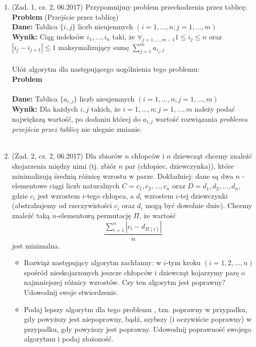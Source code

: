 \documentclass[10pt]{article}%
\begin{document}
\begin{enumerate}

\item (Zad. 1, cz. 2, 06.2017) Przypomnijmy problem przechodzenia przez tablicę: \\
\noindent\textbf{Problem} (Przejście przez tablicę) \\
\indent \textbf{Dane:} Tablica $\{i,j\}$ liczb nieujemnych $(i=1,\ldots,n; j=1,\ldots,m)$ \\
\indent \textbf{Wynik:} Ciąg indeksów $i_1, \ldots, i_n$ taki, że $\forall_{j=1,\ldots,m-1} 1 \leq i_j \leq n$ oraz $| i_j - i_{j+1} | \leq 1$ maksymalizujący sumę $\sum_{j=1}^m a_{i_j,j}$ \\~\\
Ułóż algorytm dla następującego uogólnienia tego problemu: \\
\noindent\textbf{Problem} \\~\\
\indent \textbf{Dane:} Tablica $\{ a_{i,j} \} $ liczb nieujemnych $(i=1,\ldots,n; j=1,\ldots,m)$\\
\indent \textbf{Wynik:} Dla każdych $i,j$ takich, że $i=1,\ldots,n;j=1,\ldots,m$ należy podać największą wartość, po dodaniu której do $a_{i,j}$ wartość rozwiązania \textit{problemu przejścia przez tablicę} nie ulegnie zmianie. \\~\\

\item (Zad. 2, cz. 2, 06.2017) Dla zbiorów $n$ chłopców i $n$ dziewcząt chcemy znaleźć skojarzenia między nimi (tj. zbiór $n$ par (chłopiec, dziewczynka)), które minimalizują średnią różnicę wzrostu w parze. Dokładniej: dane są dwa $n$ - elementowe ciągi liczb naturalnych $C = c_1, c_2,\ldots, c_n$ oraz $D = d_1, d_2, \ldots, d_n$, gdzie $c_i$ jest wzrostem $i$-tego chłopca, a $d_i$ wzrostem $i$-tej dziewczynki (abstrahujemy od rzeczywistości $c_i$ oraz $d_i$ mogą być dowolnie duże). Chcemy znaleźć taką $n$-elementową permutację $\Pi$, że wartość $$\frac{\sum_{i=1}^n | c_i - d_{\Pi(i)}|}{n}$$ jest minimalna. \\
\begin{itemize}
\item Rozwiąż następujący algorytm zachłanny: w $i$-tym kroku $(i=1,2,\ldots,n)$ spośród nieskojarzonych jeszcze chłopców i dziewcząt kojarzymy parę o najmniejszej różnicy  wzrostów. Czy ten algorytm jest poprawny? Udowodnij swoje stwierdzenie.
\item Podaj lepszy algorytm dla tego problemu , tzn. poprawny w przypadku, gdy powyższy jest niepoprawny, bądź, szybszy (i oczywiście poprawny) w przypadku, gdy powyższy jest poprawny. Udowodnij poprawność swojego algorytmu i podaj złożoność.
\end{itemize}


\end{enumerate}
\end{document}
